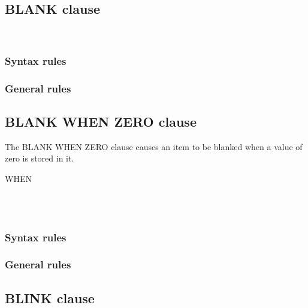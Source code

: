 \subsection{BLANK clause}

\begin{syntax}
  \begin{1=}
     \\
  \end{1=}
\end{syntax}

\subsubsection{Syntax rules}

\subsubsection{General rules}

\subsection{BLANK WHEN ZERO clause}

The BLANK WHEN ZERO clause causes an item to be blanked when a value of zero is stored in it.

\begin{syntax}
   WHEN
  \begin{1=}
     \\
     \\
  \end{1=}
\end{syntax}

\subsubsection{Syntax rules}

\subsubsection{General rules}

\subsection{BLINK clause}

\begin{syntax}
  \begin{1=}
     \\
  \end{1=}
\end{syntax}


